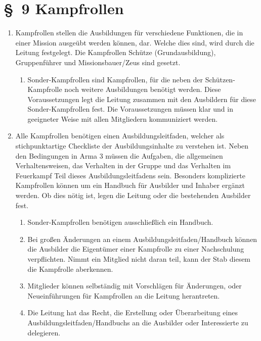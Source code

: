 \section*{\S~9 Kampfrollen}
\label{sec:kampfrollen}

\begin{enumerate}[label=(\arabic*)]
    \item Kampfrollen stellen die Ausbildungen für verschiedene Funktionen, die in einer Mission ausgeübt werden können, dar. Welche dies sind, wird durch die Leitung festgelegt. Die Kampfrollen Schütze (Grundausbildung), Gruppenführer und Missionsbauer/Zeus sind gesetzt.
    \begin{enumerate}[label=(\Alph*)]
        \item Sonder-Kampfrollen sind Kampfrollen, für die neben der Schützen-Kampfrolle noch weitere Ausbildungen benötigt werden. Diese Voraussetzungen legt die Leitung zusammen mit den Ausbildern für diese Sonder-Kampfrollen fest. Die Voraussetzungen müssen klar und in geeigneter Weise mit allen Mitgliedern kommuniziert werden.
    \end{enumerate}
    \item Alle Kampfrollen benötigen einen Ausbildungsleitfaden, welcher als stichpunktartige Checkliste der Ausbildungsinhalte zu verstehen ist. Neben den Bedingungen in Arma 3 müssen die Aufgaben, die allgemeinen Verhaltensweisen, das Verhalten in der Gruppe und das Verhalten im Feuerkampf Teil dieses Ausbildungsleitfadens sein. Besonders komplizierte Kampfrollen können um ein Handbuch für Ausbilder und Inhaber ergänzt werden. Ob dies nötig ist, legen die Leitung oder die bestehenden Ausbilder fest.
    \begin{enumerate}[label=(\Alph*)]
        \item Sonder-Kampfrollen benötigen ausschließlich ein Handbuch.
        \item Bei großen Änderungen an einem Ausbildungsleitfaden/Handbuch können die Ausbilder die Eigentümer einer Kampfrolle zu einer Nachschulung verpflichten. Nimmt ein Mitglied nicht daran teil, kann der Stab diesem die Kampfrolle aberkennen.
        \item Mitglieder können selbständig mit Vorschlägen für Änderungen, oder Neueinführungen für Kampfrollen an die Leitung herantreten.
        \item Die Leitung hat das Recht, die Erstellung oder Überarbeitung eines Ausbildungsleitfaden/Handbuchs an die Ausbilder oder Interessierte zu delegieren.

\end{enumerate}
\end{enumerate}
